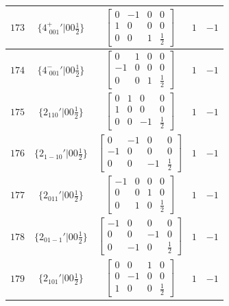 \documentclass[fleqn,8pt]{jsarticle}
\begin{document}
\begin{longtable}{ccccc}
$ 173 $ & $ \{4^{+}_{\,\,001}{}'|0 0 \frac{1}{2}\} $ & $ \begin{bmatrix} 0 & -1 & 0 & 0 \\ 1 & 0 & 0 & 0 \\ 0 & 0 & 1 & \frac{1}{2} \end{bmatrix} $ & $ 1 $ & $ -1 $ \\ \hline
$ 174 $ & $ \{4^{-}_{\,\,001}{}'|0 0 \frac{1}{2}\} $ & $ \begin{bmatrix} 0 & 1 & 0 & 0 \\ -1 & 0 & 0 & 0 \\ 0 & 0 & 1 & \frac{1}{2} \end{bmatrix} $ & $ 1 $ & $ -1 $ \\ \hline
$ 175 $ & $ \{2{}_{110}{}'|0 0 \frac{1}{2}\} $ & $ \begin{bmatrix} 0 & 1 & 0 & 0 \\ 1 & 0 & 0 & 0 \\ 0 & 0 & -1 & \frac{1}{2} \end{bmatrix} $ & $ 1 $ & $ -1 $ \\ \hline
$ 176 $ & $ \{2{}_{1-10}{}'|0 0 \frac{1}{2}\} $ & $ \begin{bmatrix} 0 & -1 & 0 & 0 \\ -1 & 0 & 0 & 0 \\ 0 & 0 & -1 & \frac{1}{2} \end{bmatrix} $ & $ 1 $ & $ -1 $ \\ \hline
$ 177 $ & $ \{2{}_{011}{}'|0 0 \frac{1}{2}\} $ & $ \begin{bmatrix} -1 & 0 & 0 & 0 \\ 0 & 0 & 1 & 0 \\ 0 & 1 & 0 & \frac{1}{2} \end{bmatrix} $ & $ 1 $ & $ -1 $ \\ \hline
$ 178 $ & $ \{2{}_{01-1}{}'|0 0 \frac{1}{2}\} $ & $ \begin{bmatrix} -1 & 0 & 0 & 0 \\ 0 & 0 & -1 & 0 \\ 0 & -1 & 0 & \frac{1}{2} \end{bmatrix} $ & $ 1 $ & $ -1 $ \\ \hline
$ 179 $ & $ \{2{}_{101}{}'|0 0 \frac{1}{2}\} $ & $ \begin{bmatrix} 0 & 0 & 1 & 0 \\ 0 & -1 & 0 & 0 \\ 1 & 0 & 0 & \frac{1}{2} \end{bmatrix} $ & $ 1 $ & $ -1 $ \\ \hline

\end{longtable}
\end{document}
